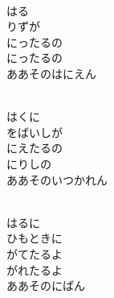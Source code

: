 \documentclass[10pt,b5j]{tarticle} %
\begin{document}
\vspace{1.5em} %
\newcommand{\linespace}{0.5em} %
\newcommand{\blocksize}{0.5\hsize} %
\newcommand{\itemmargin}{3em} %
\begin{enumerate} %
    \setlength{\itemindent}{\itemmargin} %
    \begin{minipage}[c]{\blocksize}
    
        \vspace{\linespace}
        \item~\\
        はる\\
        りずが\\
        にったるの\\
        にったるの\\
        ああそのはにえん
        
    \end{minipage}
    \begin{minipage}[c]{\blocksize}
        
        \vspace{\linespace}
        \item~\\
        はくに\\
        をばいしが\\
        にえたるの\\
        にりしの\\
        ああそのいつかれん
        
    \end{minipage}
    \begin{minipage}[c]{\blocksize}
        
        \vspace{\linespace}
        \item~\\
        はるに\\
        ひもときに\\
        がてたるよ\\
        がれたるよ\\
        ああそのにばん
    
    \end{minipage}
\end{enumerate} %
\end{document}
